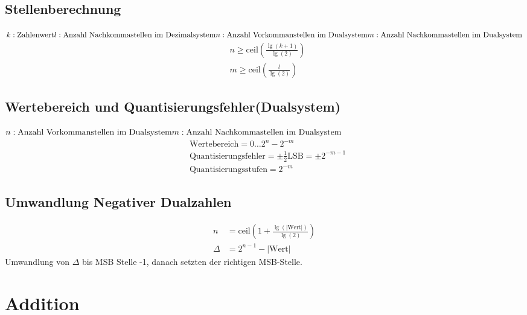 \subsection{Stellenberechnung}
\(
k: \text{Zahlenwert}\\
l: \text{Anzahl Nachkommastellen im Dezimalsystem}\\
n: \text{Anzahl Vorkommanstellen im Dualsystem}\\
m: \text{Anzahl Nachkommastellen im Dualsystem}
\)
\begin{align*}
&n\geq\text{ceil}\left(\frac{\lg\left(k+1\right)}{\lg\left(2\right)}\right)\\
&m\geq\text{ceil}\left(\frac{l}{\lg\left( 2\right)}\right)
\end{align*}

\subsection{Wertebereich und Quantisierungsfehler(Dualsystem)}
\(
n: \text{Anzahl Vorkommanstellen im Dualsystem}\\
m: \text{Anzahl Nachkommastellen im Dualsystem}
\)
\begin{align*}
&\text{Wertebereich}=0\dots 2^n-2^{-m}\\
&\text{Quantisierungsfehler}=\pm\frac{1}{2}\text{LSB}=\pm 2^{-m-1}\\
&\text{Quantisierungsstufen}=2^{-m}
\end{align*}

\subsection{Umwandlung Negativer Dualzahlen}
\begin{align*}
n&=\text{ceil}\left(1+\frac{\lg\left(|\text{Wert}|\right)}{\lg\left(2\right)}\right)\\
\Delta&=2^{n-1}-\left|\text{Wert}\right|
\end{align*}
Umwandlung von $\Delta$ bis MSB Stelle -1, danach setzten der richtigen
MSB-Stelle.

\section{Addition}
